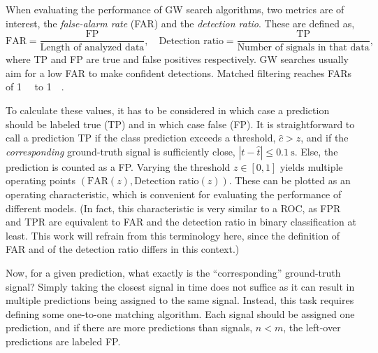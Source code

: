 When evaluating the performance of GW search algorithms, two metrics are of interest, the \emph{false-alarm rate} (FAR) and the \emph{detection ratio}. These are defined as,
\begin{equation}
	\text{FAR} = \frac{\text{FP}}{\text{Length of analyzed data}}, \quad \text{Detection ratio} = \frac{\text{TP}}{\text{Number of signals in that data}},
\end{equation}
where TP and FP are true and false positives respectively. GW searches usually aim for a low FAR to make confident detections. Matched filtering reaches FARs of \SI{1}{\per\month} to \SI{1}{\per\year}.

To calculate these values, it has to be considered in which case a prediction should be labeled true (TP) and in which case false (FP). It is straightforward to call a prediction TP if the class prediction exceeds a threshold, $\hat{c}>z$, and if the \emph{corresponding} ground-truth signal is sufficiently close, $|t-\hat{t}|\leq\SI{0.1}{\second}$. Else, the prediction is counted as a FP.
Varying the threshold $z\in[0,1]$ yields multiple operating points $(\text{FAR}(z), \text{Detection ratio}(z))$. These can be plotted as an operating characteristic, which is convenient for evaluating the performance of different models. (In fact, this characteristic is very similar to a ROC, as FPR and TPR are equivalent to FAR and the detection ratio in binary classification at least. This work will refrain from this terminology here, since the definition of FAR and of the detection ratio differs in this context.)

Now, for a given prediction, what exactly is the \enquote{corresponding} ground-truth signal? Simply taking the closest signal in time does not suffice as it can result in multiple predictions being assigned to the same signal. Instead, this task requires defining some one-to-one matching algorithm. Each signal should be assigned one prediction, and if there are more predictions than signals, $n<m$, the left-over predictions are labeled FP.

